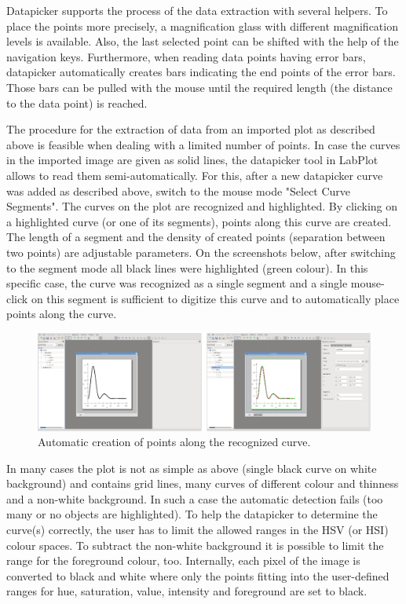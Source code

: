 Datapicker supports the process of the data extraction with several helpers. To place the points more precisely, a magnification glass with different magnification levels is available.
Also, the last selected point can be shifted with the help of the navigation keys.
Furthermore, when reading data points having error bars, datapicker automatically creates bars indicating the end points of the error bars.
Those bars can be pulled with the mouse until the required length (the distance to the data point) is reached.

The procedure for the extraction of data from an imported plot as described above is feasible when dealing with a limited number of points.
In case the curves in the imported image are given as solid lines, the datapicker tool in LabPlot allows to read them semi-automatically.
For this, after a new datapicker curve was added as described above, switch to the mouse mode "Select Curve Segments". The curves on the plot are recognized and highlighted.
By clicking on a highlighted curve (or one of its segments), points along this curve are created.
The length of a segment and the density of created points (separation between two points) are adjustable parameters.
On the screenshots below, after switching to the segment mode all black lines were highlighted (green colour).
In this specific case, the curve was recognized as a single segment and a single mouse-click on this segment is sufficient to digitize this curve and to automatically place points along the curve.
\begin{figure}
\includegraphics[width=\textwidth]{images/datapicker_segments.png}
\caption{Automatic creation of points along the recognized curve.}
\end{figure}

In many cases the plot is not as simple as above (single black curve on white background) and contains grid lines, many curves of different colour and thinness and a non-white background.
In such a case the automatic detection fails (too many or no objects are highlighted). To help the datapicker to determine the curve(s) correctly, the user has to limit the allowed ranges in the HSV (or HSI) colour spaces.
To subtract the non-white background it is possible to limit the range for the foreground colour, too.
Internally, each pixel of the image is converted to black and white where only the points fitting into the user-defined ranges for hue, saturation, value, intensity and foreground are set to black.

